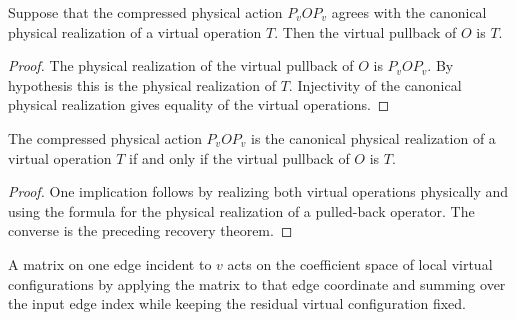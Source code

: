 \begin{theorem}%
    \label{thm:peps_localVirtualOpOfPhysicalOp_eq_of_projected_realization_eq}
    \leanok
    Suppose that the compressed physical action $P_v O P_v$ agrees with the
    canonical physical realization of a virtual operation $T$. Then the
    virtual pullback of $O$ is $T$.
\end{theorem}
\begin{proof}\leanok
    The physical realization of the virtual pullback of $O$ is
    $P_v O P_v$. By hypothesis this is the physical realization of $T$.
    Injectivity of the canonical physical realization gives equality of the
    virtual operations.
\end{proof}

\begin{theorem}%
    \label{thm:peps_localVirtualOpOfPhysicalOp_eq_iff_projected_realization_eq}
    \leanok
    The compressed physical action $P_v O P_v$ is the canonical physical
    realization of a virtual operation $T$ if and only if the virtual
    pullback of $O$ is $T$.
\end{theorem}
\begin{proof}\leanok
    One implication follows by realizing both virtual operations physically and
    using the formula for the physical realization of a pulled-back operator.
    The converse is the preceding recovery theorem.
\end{proof}

\begin{definition}%
    \label{def:peps_localIncidentMatrixOp}
    \leanok
    A matrix on one edge incident to $v$ acts on the coefficient space of local
    virtual configurations by applying the matrix to that edge coordinate and
    summing over the input edge index while keeping the residual virtual
    configuration fixed.
\end{definition}

